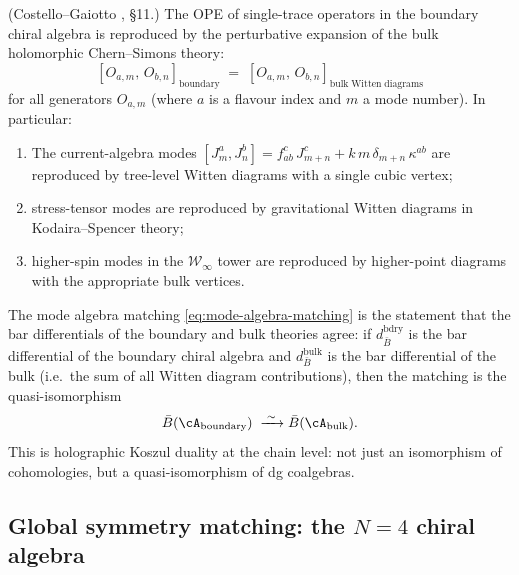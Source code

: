 \begin{proposition}
\label{prop:mode-algebra-matching}
\textup{(Costello--Gaiotto \cite{CG18}, \S11.)}
The OPE of single-trace operators in the boundary chiral algebra is
reproduced by the perturbative expansion of the bulk holomorphic
Chern--Simons theory:
\begin{equation}\label{eq:mode-algebra-matching}
 [O_{a,m},\, O_{b,n}]_{\mathrm{boundary}}
 \;=\;
 [O_{a,m},\, O_{b,n}]_{\mathrm{bulk\;Witten\;diagrams}}
\end{equation}
for all generators $O_{a,m}$ (where $a$ is a flavour index and $m$ a
mode number). In particular:
\begin{enumerate}[label=\textup{(\roman*)},nosep]
\item The current-algebra modes $[J^a_m, J^b_n] = f^{c}_{ab}\,J^c_{m+n}
 + k\,m\,\delta_{m+n}\,\kappa^{ab}$ are reproduced by
 tree-level Witten diagrams with a single cubic vertex;
\item stress-tensor modes are reproduced by gravitational Witten
 diagrams in Kodaira--Spencer theory;
\item higher-spin modes in the $\mathcal{W}_\infty$ tower are
 reproduced by higher-point diagrams with the appropriate bulk
 vertices.
\end{enumerate}
\end{proposition}

\begin{remark}
\label{rem:mode-algebra-bar}
The mode algebra matching \eqref{eq:mode-algebra-matching} is the
statement that the bar differentials of the boundary and bulk theories
agree: if $d_{\bar{B}}^{\mathrm{bdry}}$ is the bar differential of the
boundary chiral algebra and $d_{\bar{B}}^{\mathrm{bulk}}$ is the bar
differential of the bulk (i.e.\ the sum of all Witten diagram
contributions), then the matching is the quasi-isomorphism
\[
 \bar{B}(\cA_{\mathrm{boundary}})
 \;\xrightarrow{\;\sim\;}
 \bar{B}(\cA_{\mathrm{bulk}}).
\]
This is holographic Koszul duality at the chain level: not just an
isomorphism of cohomologies, but a quasi-isomorphism of dg coalgebras.
\end{remark}

\subsection{Global symmetry matching: the \texorpdfstring{$N\!=\!4$}{N=4} chiral algebra}
\label{subsec:n4-symmetry-matching}

